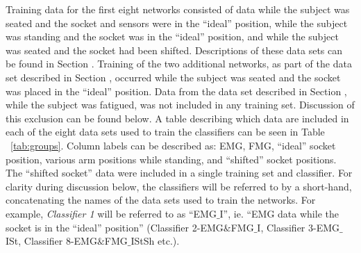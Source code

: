\documentclass[twocolumn]{sagej}
\begin{document}
Training data for the first eight networks consisted of data while the subject was seated and the socket and sensors were in the ``ideal'' position, while the subject was standing and the socket was in the ``ideal'' position, and while the subject was seated and the socket had been shifted.  Descriptions of these data sets can be found in Section \textit{}.  Training of the two additional networks, as part of the data set described in Section \textit{}, occurred while the subject was seated and the socket was placed in the ``ideal'' position. Data from the data set described in Section \textit{}, while the subject was fatigued, was not included in any training set. Discussion of this exclusion can be found below.  A table describing which data are included in each of the eight data sets used to train the classifiers can be seen in Table ~\ref{tab:groups}. Column labels can be described as: EMG, FMG, ``ideal'' socket position, various arm positions while standing, and ``shifted'' socket positions.  The ``shifted socket'' data were included in a single training set and classifier.  For clarity during discussion below, the classifiers will be referred to by a short-hand, concatenating the names of the data sets used to train the networks.  For example, \textit{Classifier 1} will be referred to as ``EMG$\_$I'', ie. ``EMG data while the socket is in the ``ideal'' position'' (Classifier 2-EMG$\&$FMG$\_$I, Classifier 3-EMG$\_$ISt, Classifier 8-EMG$\&$FMG$\_$IStSh etc.).
\end{document}
